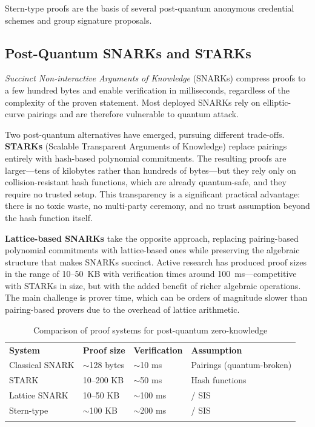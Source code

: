 Stern-type proofs are the basis of several post-quantum anonymous credential schemes and group signature proposals.


\subsection{Post-Quantum SNARKs and STARKs}
\label{subsec:snarks-starks}

\emph{Succinct Non-interactive Arguments of Knowledge} (SNARKs) compress proofs to a few hundred bytes and enable verification in milliseconds, regardless of the complexity of the proven statement.  Most deployed SNARKs rely on elliptic-curve pairings and are therefore vulnerable to quantum attack.

Two post-quantum alternatives have emerged, pursuing different trade-offs.  \textbf{STARKs} (Scalable Transparent Arguments of Knowledge) replace pairings entirely with hash-based polynomial commitments.  The resulting proofs are larger---tens of kilobytes rather than hundreds of bytes---but they rely only on collision-resistant hash functions, which are already quantum-safe, and they require no trusted setup.  This transparency is a significant practical advantage: there is no toxic waste, no multi-party ceremony, and no trust assumption beyond the hash function itself.

\textbf{Lattice-based SNARKs} take the opposite approach, replacing pairing-based polynomial commitments with lattice-based ones while preserving the algebraic structure that makes SNARKs succinct.  Active research has produced proof sizes in the range of 10--50~KB with verification times around 100~ms---competitive with STARKs in size, but with the added benefit of richer algebraic operations.  The main challenge is prover time, which can be orders of magnitude slower than pairing-based provers due to the overhead of lattice arithmetic.

\begin{table}[t]
\caption{Comparison of proof systems for post-quantum zero-knowledge}
\label{tab:pq-zk}
\begin{tabular}{p{3cm}p{2.5cm}p{2.5cm}p{3.5cm}}
\hline\noalign{\smallskip}
\textbf{System} & \textbf{Proof size} & \textbf{Verification} & \textbf{Assumption} \\
\noalign{\smallskip}\svhline\noalign{\smallskip}
Classical SNARK & $\sim$128 bytes & $\sim$10 ms & Pairings (quantum-broken) \\
STARK & 10--200 KB & $\sim$50 ms & Hash functions \\
Lattice SNARK & 10--50 KB & $\sim$100 ms & \lwe{} / \textsc{SIS} \\
Stern-type & $\sim$100 KB & $\sim$200 ms & \lwe{} / \textsc{SIS} \\
\noalign{\smallskip}\hline
\end{tabular}
\end{table}


